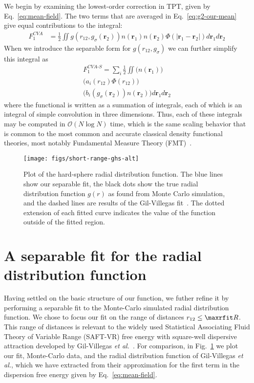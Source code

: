 \documentclass[letterpaper,twocolumn,amsmath,amssymb,pre,aps,10pt]{revtex4-1}
\newcommand{\rr}{\textbf{r}}
\begin{document}
We begin by examining the lowest-order correction in TPT, given by
Eq.~\ref{eq:mean-field}.  The two terms that are averaged in
Eq.~\ref{eq:g2-our-mean} give equal contributions to the integral:
\begin{align}
  F_1^{\textit{CVA}} &= \tfrac12 \!\! \iint \!\!
  g(r_{12},g_\sigma(\rr_2))n(\rr_1)n(\rr_2)\Phi(|\rr_1-\rr_2|)
  d\rr_1d\rr_2
\end{align}
When we introduce the separable form for $g(r_{12},g_\sigma)$ we can
further simplify this integral as
\begin{multline}
  F_1^{\textit{CVA-S}} =
  \sum_i \tfrac12 \!\! \iint \!\! \bigg( n(\rr_1)  \bigg) \\
                             \bigg( a_i(r_{12})\Phi(r_{12}) \bigg) \\
                             \bigg( b_i(g_\sigma(\rr_2))n(\rr_2) \bigg)
  d\rr_1d\rr_2
\end{multline}
where the functional is written as a summation of integrals, each of
which is an integral of simple convolution in three dimensions.  Thus,
each of these integrals may be computed in $\mathcal{O}(N\log N)$
time, which is the same scaling behavior that is common to the most
common and accurate classical density functional theories, most
notably Fundamental Measure Theory (FMT)~\cite{rosenfeld1989free,
  roth2002whitebear}.

\begin{figure}
  \centering
  \texttt{[image: figs/short-range-ghs-alt]}
  \caption{Plot of the hard-sphere radial distribution function. The
    blue lines show our separable fit, the black dots show the true
    radial distribution function $g(r)$ as found from Monte Carlo
    simulation, and the dashed lines are results of the
    Gil-Villegas fit~\cite{gil1997statistical}.  The dotted extension
    of each fitted curve indicates the value of the function outside
    of the fitted region.  }\label{fig:radial-distribution}
\end{figure}

\section{A separable fit for the radial distribution function}\label{sec:separable-fit}

Having settled on the basic structure of our function, we futher
refine it by performing a separable fit to the Monte-Carlo simulated
radial distribution function.  We chose to focus our fit on the range
of distances $r_{12} \le \maxrfit R$.  This range of distances is
relevant to the widely used
\cite{chapman1989saft,muller2001molecular,tan2008recent} Statistical
Associating Fluid Theory of Variable Range (SAFT-VR) free energy with
square-well dispersive attraction developed by Gil-Villegas \emph{et
  al.}~\cite{gil1997statistical}.  For comparison, in
Fig.~\ref{fig:radial-distribution} we plot our fit, Monte-Carlo data,
and the radial distribution function of Gil-Villegas \emph{et al.},
which we have extracted from their approximation for the first term in
the dispersion free energy given by Eq.~\ref{eq:mean-field}.
\end{document}

